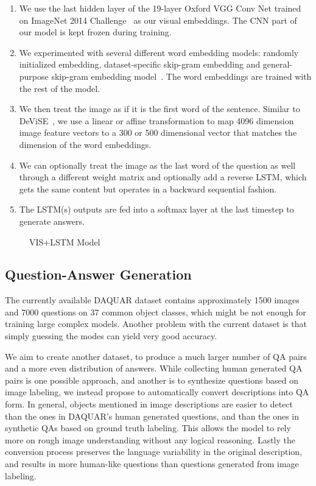 \begin{enumerate}
\item We use the last hidden layer of the 19-layer Oxford VGG Conv Net
\cite{simonyan14} trained on ImageNet 2014 Challenge~\cite{ilsvrc14} as our
visual embeddings. The CNN part of our model is kept frozen during training.

\item We experimented with several different word embedding models: randomly
initialized embedding, dataset-specific skip-gram embedding and general-purpose
skip-gram embedding model~\cite{mikolov13}. The word embeddings are trained
with the rest of the model.

\item We then treat the image as if it is the first word of the sentence.
Similar to DeViSE~\cite{frome13}, we use a linear or affine transformation to
map 4096 dimension image feature vectors to a 300 or 500 dimensional vector
that matches the dimension of the word embeddings.

\item We can optionally treat the image as the last word of the question as
well through a different weight matrix and optionally add a reverse LSTM, which
gets the same content but operates in a backward sequential fashion.

\item The LSTM(s) outputs are fed into a softmax layer at the last timestep to
generate answers.
\end{enumerate}

\begin{figure}
\centering
\scalebox{0.6}{
}
\caption{VIS+LSTM Model}
\label{fig:imgword}
\end{figure}

\subsection{Question-Answer Generation}
The currently available DAQUAR dataset contains approximately 1500 images and
7000 questions on 37 common object classes, which might be not enough for
training large complex models. Another problem with the current dataset is that
simply guessing the modes can yield very good accuracy.

We aim to create another dataset, to produce a much larger number of QA pairs
and a more even distribution of answers. While collecting human generated QA
pairs is one possible approach, and another is to synthesize questions based on
image labeling, we instead propose to automatically convert descriptions into
QA form. In general, objects mentioned in image descriptions are easier to
detect than the ones in DAQUAR's human generated questions, and than the ones
in synthetic QAs based on ground truth labeling. This allows the model to
rely more on rough image understanding without any logical reasoning. Lastly
the conversion process preserves the language variability in the original
description, and results in more human-like questions than questions generated
from image labeling.

